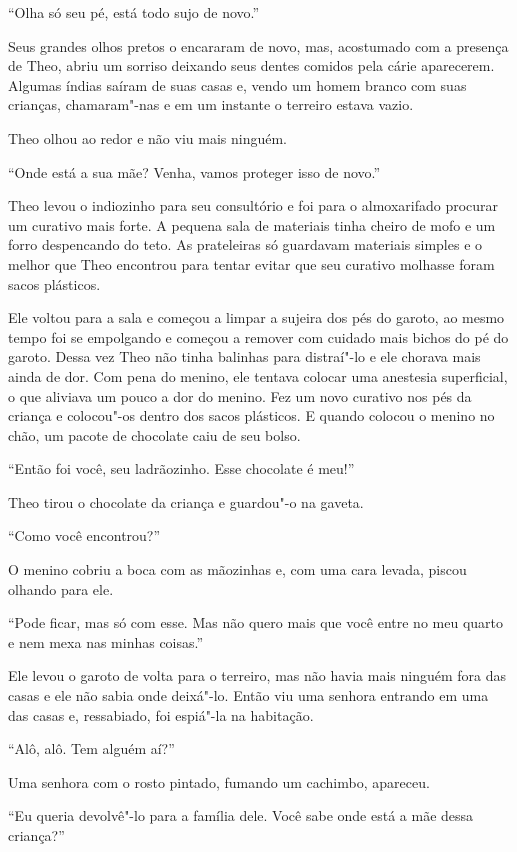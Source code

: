 ``Olha só seu pé, está todo sujo de novo.''

Seus grandes olhos pretos o encararam de novo, mas, acostumado com a
presença de Theo, abriu um sorriso deixando seus dentes comidos pela
cárie aparecerem. Algumas índias saíram de suas casas e, vendo um homem
branco com suas crianças, chamaram"-nas e em um instante o terreiro
estava vazio.

Theo olhou ao redor e não viu mais ninguém.

``Onde está a sua mãe? Venha, vamos proteger isso de novo.''

Theo levou o indiozinho para seu consultório e foi para o almoxarifado
procurar um curativo mais forte. A pequena sala de materiais tinha
cheiro de mofo e um forro despencando do teto. As prateleiras só
guardavam materiais simples e o melhor que Theo encontrou para tentar
evitar que seu curativo molhasse foram sacos plásticos.

Ele voltou para a sala e começou a limpar a sujeira dos pés do garoto,
ao mesmo tempo foi se empolgando e começou a remover com cuidado mais
bichos do pé do garoto. Dessa vez Theo não tinha balinhas para
distraí"-lo e ele chorava mais ainda de dor. Com pena do menino, ele
tentava colocar uma anestesia superficial, o que aliviava um pouco a dor
do menino. Fez um novo curativo nos pés da criança e colocou"-os dentro
dos sacos plásticos. E quando colocou o menino no chão, um pacote de
chocolate caiu de seu bolso.

``Então foi você, seu ladrãozinho. Esse chocolate é meu!''

Theo tirou o chocolate da criança e guardou"-o na gaveta.

``Como você encontrou?''

O menino cobriu a boca com as mãozinhas e, com uma cara levada, piscou
olhando para ele.

``Pode ficar, mas só com esse. Mas não quero mais que você entre no meu
quarto e nem mexa nas minhas coisas.''

Ele levou o garoto de volta para o terreiro, mas não havia mais ninguém
fora das casas e ele não sabia onde deixá"-lo. Então viu uma senhora
entrando em uma das casas e, ressabiado, foi espiá"-la na habitação.

``Alô, alô. Tem alguém aí?''

Uma senhora com o rosto pintado, fumando um cachimbo, apareceu.

``Eu queria devolvê"-lo para a família dele. Você sabe onde está a mãe
dessa criança?''

